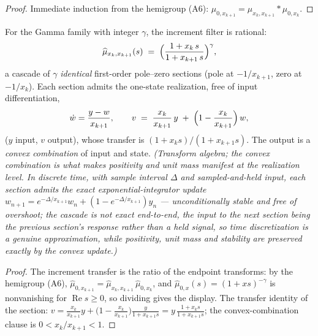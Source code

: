 \begin{proof}
Immediate induction from the hemigroup (A6): $\mu_{0,x_{k+1}} = \mu_{x_k, x_{k+1}} * \mu_{0,x_k}$.
\end{proof}

\begin{proposition}\label{prop:gamma-cascade}
For the Gamma family with integer $\gamma$, the increment filter is rational:
\[
  \widehat{\mu}_{x_k, x_{k+1}}(s) \;=\; \Bigl(\frac{1 + x_k\, s}{1 + x_{k+1}\, s}\Bigr)^{\gamma},
\]
a cascade of $\gamma$ \emph{identical} first-order pole--zero sections (pole at $-1/x_{k+1}$,
zero at $-1/x_k$). Each section admits the one-state realization, free of input differentiation,
\[
  \dot w = \frac{y - w}{x_{k+1}}, \qquad
  v \;=\; \frac{x_k}{x_{k+1}}\, y \;+\; \Bigl(1 - \frac{x_k}{x_{k+1}}\Bigr)\, w,
\]
($y$ input, $v$ output), whose transfer is $(1 + x_k s)/(1 + x_{k+1} s)$. The output is a
\emph{convex combination} of input and state.
\statusT\quad\emph{(Transform algebra; the convex combination is what makes positivity and
unit mass manifest at the realization level. In discrete time, with sample interval
$\Delta$ and sampled-and-held input, each section admits the exact exponential-integrator
update $w_{n+1} = e^{-\Delta/x_{k+1}} w_n + (1 - e^{-\Delta/x_{k+1}}) y_n$ ---
unconditionally stable and free of overshoot; the cascade is not exact end-to-end, the
input to the next section being the previous section's response rather than a held
signal, so time discretization is a genuine approximation, while positivity, unit mass
and stability are preserved exactly by the convex update.)}
\end{proposition}

\begin{proof}
The increment transfer is the ratio of the endpoint transforms: by the hemigroup (A6),
$\widehat{\mu}_{0,x_{k+1}} = \widehat{\mu}_{x_k,x_{k+1}}\,\widehat{\mu}_{0,x_k}$, and
$\widehat{\mu}_{0,x}(s) = (1 + x s)^{-\gamma}$ is nonvanishing for $\operatorname{Re} s \ge 0$,
so dividing gives the display. The transfer identity of the section:
$v = \tfrac{x_k}{x_{k+1}} y + \bigl(1 - \tfrac{x_k}{x_{k+1}}\bigr)\tfrac{y}{1 + x_{k+1}s}
= y\,\tfrac{1 + x_k s}{1 + x_{k+1} s}$; the convex-combination clause is
$0 < x_k/x_{k+1} < 1$.
\end{proof}


